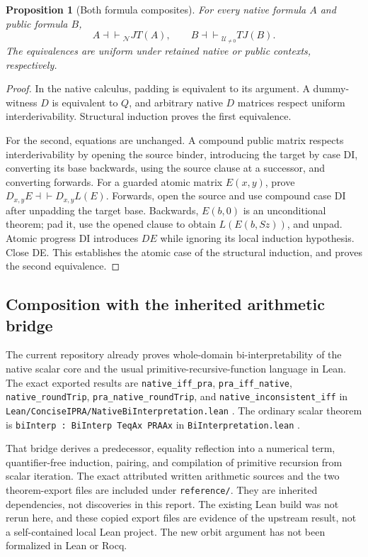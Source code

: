 \documentclass[11pt,letterpaper]{article}
\newtheorem{proposition}[theorem]{Proposition}
\theoremstyle{definition}\newtheorem{definition}[theorem]{Definition}
\theoremstyle{remark}\newtheorem{remark}[theorem]{Remark}
\newcommand{\UR}{\mathcal U_{\ne0}}
\newcommand{\NC}{\mathcal N}
\newcommand{\file}[1]{{\small\nolinkurl{#1}}}
\newcommand{\equider}{\mathrel{\dashv\vdash}}
\begin{document}
\begin{proposition}[Both formula composites]\label{prop:composites}
For every native formula $A$ and public formula $B$,
\[
 A\equider_{\NC}JT(A),\qquad B\equider_{\UR}TJ(B).
\]
The equivalences are uniform under retained native or public contexts,
respectively.
\end{proposition}
\begin{proof}
In the native calculus, padding is equivalent to its argument. A
dummy-witness $D$ is equivalent to $Q$, and arbitrary native $D$ matrices
respect uniform interderivability. Structural induction proves the first
equivalence.

For the second, equations are unchanged. A compound public matrix respects
interderivability by opening the source binder, introducing the target by
case DI, converting its base backwards, using the source clause at a
successor, and converting forwards.
For a guarded atomic matrix $E(x,y)$, prove
$D_{x,y}E\equider D_{x,y}L(E)$. Forwards, open the source and use compound
case DI after unpadding the target base. Backwards, $E(b,0)$ is an
unconditional theorem; pad it, use the opened clause to obtain
$L(E(b,Sz))$, and unpad. Atomic progress DI introduces $D E$ while ignoring
its local induction hypothesis. Close DE. This establishes the atomic
case of the structural induction, and proves the second equivalence.
\end{proof}

\subsection{Composition with the inherited arithmetic bridge}

The current repository already proves whole-domain bi-interpretability of
the native scalar core and the usual primitive-recursive-function language
in Lean. The exact exported results are
\file{native_iff_pra}, \file{pra_iff_native},
\file{native_roundTrip}, \file{pra_native_roundTrip}, and
\file{native_inconsistent_iff} in
\file{Lean/ConciseIPRA/NativeBiInterpretation.lean} \cite{lean-native}.
The ordinary scalar theorem is \file{biInterp : BiInterp TeqAx PRAAx}
in \file{BiInterpretation.lean} \cite{lean-scalar}.

That bridge derives a predecessor, equality reflection into a numerical
term, quantifier-free induction, pairing, and compilation of primitive
recursion from scalar iteration. The exact attributed written arithmetic
sources and the two theorem-export files are included under
\file{reference/}. They are inherited dependencies, not discoveries in this
report. The existing Lean build was not rerun here, and these copied export
files are evidence of the upstream result, not a self-contained local Lean
project. The new orbit argument has not been formalized in Lean or Rocq.
\end{document}
